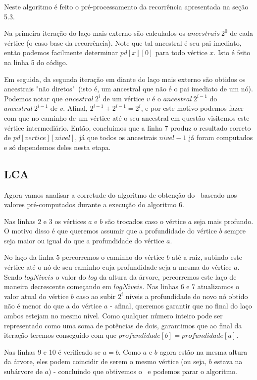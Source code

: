 Neste algoritmo é feito o pré-processamento da recorrência apresentada na seção 5.3.

Na primeira iteração do laço mais externo são calculados os $ancestrais\ 2^0$ de cada vértice (o caso base da recorrência). Note que tal ancestral é seu pai imediato, então podemos facilmente determinar $pd[x][0]$ para todo vértice $x$. Isto é feito na linha 5 do código.

Em seguida, da segunda iteração em diante do laço mais externo são obtidos os ancestrais "não diretos"\ (isto é, um ancestral que não é o pai imediato de um nó). Podemos notar que $ancestral\ 2^i$ de um vértice $v$ é o $ancestral\ 2^{i-1}$ do $ancestral\ 2^{i-1}$ de $v$. Afinal, $2^{i-1} + 2^{i-1} = 2^i$, e por este motivo podemos fazer com que no caminho de um vértice até o seu ancestral em questão visitemos este vértice intermediário. Então, concluimos que a linha 7 produz o resultado correto de $pd[vertice][nivel]$, já que todos os ancestrais $nivel - 1$ já foram computados e só dependemos deles nesta etapa.


\subsection{LCA}

Agora vamos analisar a corretude do algoritmo de obtenção do \LCA\ baseado nos valores pré-computados durante a execução do algoritmo 6.

Nas linhas 2 e 3 os vértices $a$ e $b$ são trocados caso o vértice $a$ seja mais profundo. O motivo disso é que queremos assumir que a profundidade do vértice $b$ sempre seja maior ou igual do que a profundidade do vértice $a$.

No laço da linha 5 percorremos o caminho do vértice $b$ até a raiz, subindo este vértice até o nó de seu caminho cuja profundidade seja a mesma do vértice $a$. Sendo $logNiveis$ o valor do $log$ da altura da árvore, percorremos este laço de maneira decrescente começando em $logNiveis$. Nas linhas 6 e 7 atualizamos o valor atual do vértice $b$ caso ao subir $2^i$ níveis a profundidade do novo nó obtido não é menor do que a do vértice $a$ - afinal, queremos garantir que no final do laço ambos estejam no mesmo nível. Como qualquer número inteiro pode ser representado como uma soma de potências de dois, garantimos que ao final da iteração teremos conseguido com que $profundidade[b] = profundidade[a]$.

Nas linhas 9 e 10 é verificado se $a = b$. Como $a$ e $b$ agora estão na mesma altura da árvore, eles podem coincidir de serem o mesmo vértice (ou seja, $b$ estava na subárvore de $a$) - concluindo que obtivemos o \LCA\ e podemos parar o algoritmo.

